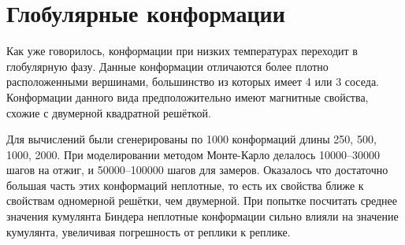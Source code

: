 \section{Глобулярные конформации}
Как уже говорилось, конформации при низких температурах переходит в глобулярную фазу. Данные конформации отличаются более плотно расположенными вершинами, большинство из которых имеет 4 или 3 соседа. Конформации данного вида предположительно имеют магнитные свойства, схожие с двумерной квадратной решёткой. 

Для вычислений были сгенерированы по 1000 конформаций длины 250, 500, 1000, 2000. При моделировании методом Монте-Карло делалось 10000--30000 шагов на отжиг, и 50000--100000 шагов для замеров. 
Оказалось что достаточно большая часть этих конформаций неплотные, то есть их свойства ближе к свойствам одномерной решётки, чем двумерной. При попытке посчитать среднее значения кумулянта Биндера неплотные конформации сильно влияли на значение кумулянта, увеличивая погрешность от реплики к реплике.

